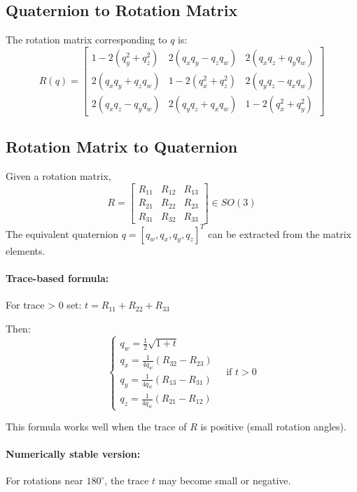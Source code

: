 \documentclass[11pt,a4paper]{article}
\begin{document}
\subsection*{Quaternion to Rotation Matrix}

The rotation matrix corresponding to \( q \) is:
\[
R(q) =
\begin{bmatrix}
1 - 2(q_y^2 + q_z^2) & 2(q_x q_y - q_z q_w) & 2(q_x q_z + q_y q_w) \\
2(q_x q_y + q_z q_w) & 1 - 2(q_x^2 + q_z^2) & 2(q_y q_z - q_x q_w) \\
2(q_x q_z - q_y q_w) & 2(q_y q_z + q_x q_w) & 1 - 2(q_x^2 + q_y^2)
\end{bmatrix}
\]

\subsection*{Rotation Matrix to Quaternion}

Given a rotation matrix,
\[
R =
\begin{bmatrix}
R_{11} & R_{12} & R_{13} \\
R_{21} & R_{22} & R_{23} \\
R_{31} & R_{32} & R_{33}
\end{bmatrix} \in SO(3)
\]
The equivalent quaternion \( q = [q_w, q_x, q_y, q_z]^T \) can be extracted from the matrix elements.

\paragraph{Trace-based formula:} For trace > 0 set: \(t = R_{11} + R_{22} + R_{33} \)

Then:
\[
\begin{cases}
q_w = \tfrac{1}{2}\sqrt{1 + t} \\
q_x = \tfrac{1}{4q_w}(R_{32} - R_{23}) \\
q_y = \tfrac{1}{4q_w}(R_{13} - R_{31}) \\
q_z = \tfrac{1}{4q_w}(R_{21} - R_{12})
\end{cases}
\quad \text{if } t > 0
\]

This formula works well when the trace of \(R\) is positive (small rotation angles).

\paragraph{Numerically stable version:}
For rotations near \(180^\circ\), the trace \(t\) may become small or negative.
\end{document}

